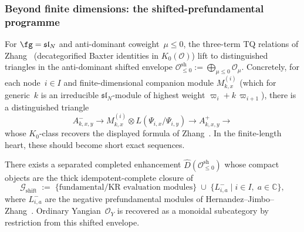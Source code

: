 \subsubsection*{Beyond finite dimensions: the shifted-prefundamental programme}

\begin{conjecture}
\label{conj:baxter-exact-triangles}
For $\fg = \mathfrak{sl}_N$ and anti-dominant coweight~$\mu \leq 0$,
the three-term TQ relations of Zhang~\cite{Zhang24}
\textup{(}decategorified Baxter identities in
$K_0(\mathcal{O})$\textup{)} lift to distinguished triangles in
the anti-dominant shifted envelope
$\mathcal{O}^{\mathrm{sh}}_{\leq 0}
:= \bigoplus_{\mu \leq 0} \mathcal{O}_\mu$.
Concretely, for each node~$i \in I$ and finite-dimensional companion
module $M_{k,x}^{(i)}$ \textup{(}which for generic~$k$ is
an irreducible $\mathfrak{sl}_N$-module of highest weight
$\varpi_i + k\,\varpi_{i+1}$\textup{)}, there is a distinguished
triangle
\[
A^-_{k,x,y} \to M_{k,x}^{(i)} \otimes L(\Psi_{i,x}/\Psi_{i,y})
\to A^+_{k,x,y} \to
\]
whose $K_0$-class recovers the displayed formula of Zhang~\cite{Zhang24}.
In the finite-length heart, these should become short exact sequences.
\end{conjecture}

\begin{conjecture}
\label{conj:shifted-prefundamental-generation}
There exists a separated completed enhancement
$\widehat{D}(\mathcal{O}^{\mathrm{sh}}_{\leq 0})$
whose compact objects are the thick idempotent-complete closure of
\[
\mathcal{G}_{\mathrm{shift}}
\;:=\;
\{\text{fundamental/KR evaluation modules}\}
\;\cup\;
\{L^-_{i,a} \mid i \in I,\; a \in \mathbb{C}\},
\]
where $L^-_{i,a}$ are the negative prefundamental modules of
Hernandez--Jimbo--Zhang~\cite{HJZ25}.  Ordinary Yangian~$\mathcal{O}_Y$ is
recovered as a monoidal subcategory by restriction from this
shifted envelope.
\end{conjecture}


